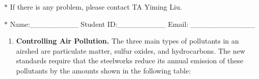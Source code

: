 \documentclass[12pt,a4paper]{article}
\theoremstyle{definition}
\begin{document}
\noindent

\noindent{}
\begin{center}
\footnotesize{\color{red}$*$ If there is any problem, please contact TA Yiming Liu. }

\footnotesize{\color{blue}$*$ Name:\_\_\_\_\_\_\_\_\_  \quad Student ID:\_\_\_\_\_\_\_\_\_ \quad Email: \_\_\_\_\_\_\_\_\_\_\_\_}
\end{center}
\begin{enumerate}

   \item 
   \textbf{Controlling Air Pollution. }The three main types of pollutants in an airshed are particulate matter, sulfur oxides, and hydrocarbons. The new standards require that the steelworks reduce its annual emission of these pollutants by the amounts shown in the following table: 
	\begin{table}[h]
		\footnotesize
		\centering
	    \label{standards}
	    \renewcommand\arraystretch{1.1}
		\begin{tabular}{lc}
			

\end{tabular}
\end{table}
\end{enumerate}
\end{document}
